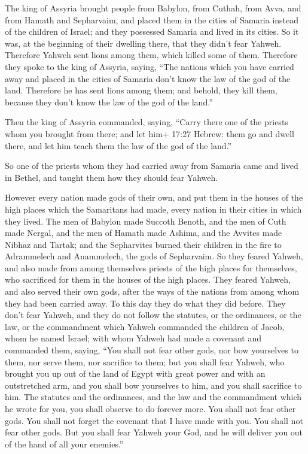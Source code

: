  The king of Assyria brought people from Babylon, from
Cuthah, from Avva, and from Hamath and Sepharvaim, and placed them in
the cities of Samaria instead of the children of Israel; and they
possessed Samaria and lived in its cities.  So it was, at
the beginning of their dwelling there, that they didn't fear Yahweh.
Therefore Yahweh sent lions among them, which killed some of them.
 Therefore they spoke to the king of Assyria, saying, ``The
nations which you have carried away and placed in the cities of Samaria
don't know the law of the god of the land. Therefore he has sent lions
among them; and behold, they kill them, because they don't know the law
of the god of the land.''

 Then the king of Assyria commanded, saying, ``Carry there
one of the priests whom you brought from there; and let him+ 17:27
Hebrew: them go and dwell there, and let him teach them the law of the
god of the land.''

 So one of the priests whom they had carried away from
Samaria came and lived in Bethel, and taught them how they should fear
Yahweh.

 However every nation made gods of their own, and put them
in the houses of the high places which the Samaritans had made, every
nation in their cities in which they lived.  The men of
Babylon made Succoth Benoth, and the men of Cuth made Nergal, and the
men of Hamath made Ashima,  and the Avvites made Nibhaz and
Tartak; and the Sepharvites burned their children in the fire to
Adrammelech and Anammelech, the gods of Sepharvaim.  So
they feared Yahweh, and also made from among themselves priests of the
high places for themselves, who sacrificed for them in the houses of the
high places.  They feared Yahweh, and also served their own
gods, after the ways of the nations from among whom they had been
carried away.  To this day they do what they did before.
They don't fear Yahweh, and they do not follow the statutes, or the
ordinances, or the law, or the commandment which Yahweh commanded the
children of Jacob, whom he named Israel;  with whom Yahweh
had made a covenant and commanded them, saying, ``You shall not fear
other gods, nor bow yourselves to them, nor serve them, nor sacrifice to
them;  but you shall fear Yahweh, who brought you up out of
the land of Egypt with great power and with an outstretched arm, and you
shall bow yourselves to him, and you shall sacrifice to him.
 The statutes and the ordinances, and the law and the
commandment which he wrote for you, you shall observe to do forever
more. You shall not fear other gods.  You shall not forget
the covenant that I have made with you. You shall not fear other gods.
 But you shall fear Yahweh your God, and he will deliver
you out of the hand of all your enemies.''

